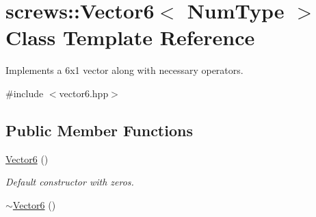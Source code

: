 \hypertarget{singletonscrews_1_1_vector6}{\section{screws\+:\+:Vector6$<$ Num\+Type $>$ Class Template Reference}
\label{singletonscrews_1_1_vector6}
}


Implements a 6x1 vector along with necessary operators.  




{\ttfamily \#include $<$vector6.\+hpp$>$}

\subsection*{Public Member Functions}
\begin{DoxyCompactItemize}
\item 
\hypertarget{singletonscrews_1_1_vector6_ab4e63af4f876c76dc05ca8485e4c77d7}{\hyperlink{singletonscrews_1_1_vector6_ab4e63af4f876c76dc05ca8485e4c77d7}{Vector6} ()}\label{singletonscrews_1_1_vector6_ab4e63af4f876c76dc05ca8485e4c77d7}

\begin{DoxyCompactList}\small\item\em Default constructor with zeros. \end{DoxyCompactList}\item 
\hypertarget{singletonscrews_1_1_vector6_a2716c1851cfcd6c53a088025a9aac921}{\hyperlink{singletonscrews_1_1_vector6_a2716c1851cfcd6c53a088025a9aac921}{$\sim$\+Vector6} ()}\label{singletonscrews_1_1_vector6_a2716c1851cfcd6c53a088025a9aac921}


\end{DoxyCompactItemize}

